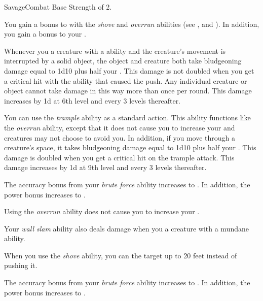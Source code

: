     \begin{feat}{Savage}{Combat}
        \featpre Base Strength of 2.

         You gain a  bonus to  with the \textit{shove} and \textit{overrun} abilities (see , and ).
        In addition, you gain a  bonus to your  .

         Whenever you  a creature with a  ability and the creature's movement is interrupted by a solid object, the object and creature both take bludgeoning damage equal to 1d10 plus half your .
        This damage is not doubled when you get a critical hit with the ability that caused the push.
        Any individual creature or object cannot take damage in this way more than once per round.
        This damage increases by \plus1d at 6th level and every 3 levels thereafter.

         You can use the \textit{trample} ability as a standard action.
        This ability functions like the \textit{overrun} ability, except that it does not cause you to increase your  and creatures may not choose to avoid you.
        In addition, if you move through a creature's space, it takes bludgeoning damage equal to 1d10 plus half your .
        This damage is doubled when you get a critical hit on the trample attack.
        This damage increases by \plus1d at 9th level and every 3 levels thereafter.

         The accuracy bonus from your \textit{brute force} ability increases to .
        In addition, the power bonus increases to .

         Using the \textit{overrun} ability does not cause you to increase your .

         Your \textit{wall slam} ability also deals damage when you  a creature with a mundane ability.

         When you use the \textit{shove} ability, you can  the target up to 20 feet instead of pushing it.

         The accuracy bonus from your \textit{brute force} ability increases to .
        In addition, the power bonus increases to .
    \end{feat}

